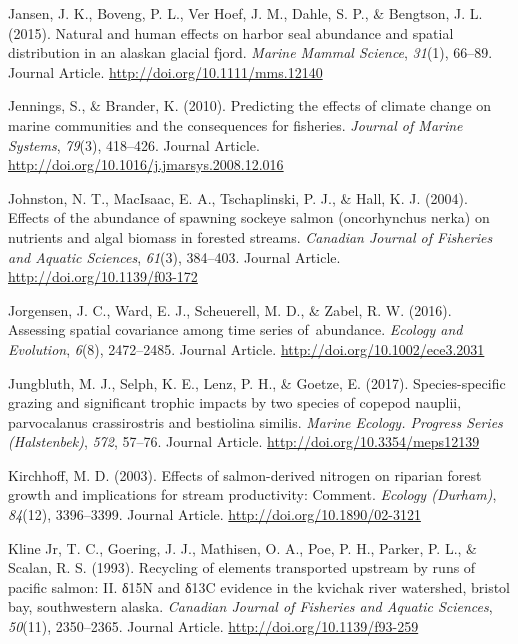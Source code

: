 \documentclass [11pt, proquest] {uwthesis}[2015/03/03]
\begin{document}
\hypertarget{ref-Jansen2015}{}
Jansen, J. K., Boveng, P. L., Ver Hoef, J. M., Dahle, S. P., \&
Bengtson, J. L. (2015). Natural and human effects on harbor seal
abundance and spatial distribution in an alaskan glacial fjord.
\emph{Marine Mammal Science}, \emph{31}(1), 66--89. Journal Article.
\url{http://doi.org/10.1111/mms.12140}

\hypertarget{ref-Jennings2010}{}
Jennings, S., \& Brander, K. (2010). Predicting the effects of climate
change on marine communities and the consequences for fisheries.
\emph{Journal of Marine Systems}, \emph{79}(3), 418--426. Journal
Article. \url{http://doi.org/10.1016/j.jmarsys.2008.12.016}

\hypertarget{ref-Johnston2004}{}
Johnston, N. T., MacIsaac, E. A., Tschaplinski, P. J., \& Hall, K. J.
(2004). Effects of the abundance of spawning sockeye salmon
(oncorhynchus nerka) on nutrients and algal biomass in forested streams.
\emph{Canadian Journal of Fisheries and Aquatic Sciences}, \emph{61}(3),
384--403. Journal Article. \url{http://doi.org/10.1139/f03-172}

\hypertarget{ref-Jorgensen2016}{}
Jorgensen, J. C., Ward, E. J., Scheuerell, M. D., \& Zabel, R. W.
(2016). Assessing spatial covariance among time series of~abundance.
\emph{Ecology and Evolution}, \emph{6}(8), 2472--2485. Journal Article.
\url{http://doi.org/10.1002/ece3.2031}

\hypertarget{ref-Jungbluth2017}{}
Jungbluth, M. J., Selph, K. E., Lenz, P. H., \& Goetze, E. (2017).
Species-specific grazing and significant trophic impacts by two species
of copepod nauplii, parvocalanus crassirostris and bestiolina similis.
\emph{Marine Ecology. Progress Series (Halstenbek)}, \emph{572}, 57--76.
Journal Article. \url{http://doi.org/10.3354/meps12139}

\hypertarget{ref-Kirchoff2003}{}
Kirchhoff, M. D. (2003). Effects of salmon-derived nitrogen on riparian
forest growth and implications for stream productivity: Comment.
\emph{Ecology (Durham)}, \emph{84}(12), 3396--3399. Journal Article.
\url{http://doi.org/10.1890/02-3121}

\hypertarget{ref-Kline1993}{}
Kline Jr, T. C., Goering, J. J., Mathisen, O. A., Poe, P. H., Parker, P.
L., \& Scalan, R. S. (1993). Recycling of elements transported upstream
by runs of pacific salmon: II. δ15N and δ13C evidence in the kvichak
river watershed, bristol bay, southwestern alaska. \emph{Canadian
Journal of Fisheries and Aquatic Sciences}, \emph{50}(11), 2350--2365.
Journal Article. \url{http://doi.org/10.1139/f93-259}
\end{document}

